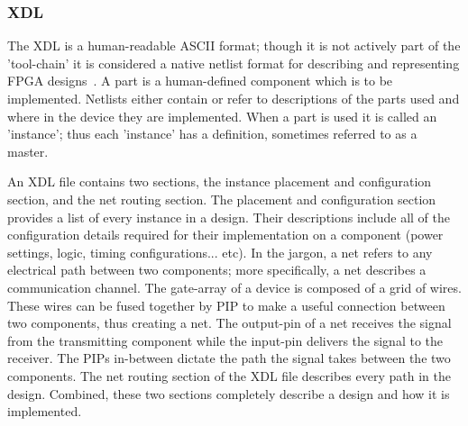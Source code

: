 \subsubsection{\acrfull{XDL}} \label{sec:XDL}
The \acrfull{XDL} is a human-readable ASCII format; though it is not actively part of the 'tool-chain' it is considered a native netlist format for describing and representing \acrshort{FPGA} designs~\cite{xdlTutorial}. 
A part is a human-defined component which is to be implemented.
Netlists either contain or refer to descriptions of the parts used and where in the device they are implemented.
When a part is used it is called an 'instance'; thus each 'instance' has a definition, sometimes referred to as a master.

An \acrshort{XDL} file contains two sections, the instance placement and configuration section, and the net routing section. 
The placement and configuration section provides a list of every instance in a design. 
Their descriptions include all of the configuration details required for their implementation on a component (power settings, logic, timing configurations... etc).
In the \Xilinx jargon, a net refers to any electrical path between two components; more specifically, a net describes a communication channel.
The gate-array of a \Xilinx device is composed of a grid of wires.
These wires can be fused together by \acrfull{PIP} to make a useful connection between two components, thus creating a net.
The output-pin of a net receives the signal from the transmitting component while the input-pin delivers the signal to the receiver.
The \acrshort{PIP}s in-between dictate the path the signal takes between the two components.
The net routing section of the \acrshort{XDL} file describes every path in the design.
Combined, these two sections completely describe a design and how it is implemented.
